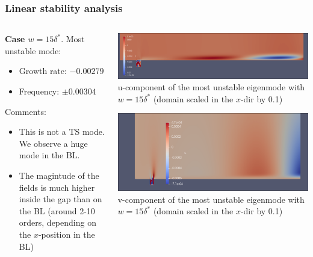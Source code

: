 \documentclass[
  aspectratio=169, %
  t, %
  onlytextwidth, %
  10pt, %
]{beamer}
\begin{document}
\begin{frame}
  \frametitle{Linear stability analysis}
  \begin{columns}[T] %
    \begin{column}{0.48\linewidth} %
      \textbf{Case $w = 15\delta^*$}. Most unstable mode:
      \begin{itemize}
	\item Growth rate: $-0.00279$
	\item Frequency: $\pm0.00304$
      \end{itemize}
      Comments:
      \begin{itemize}
	\item This is not a TS mode. We observe a huge mode in the BL.
	\item The magintude of the fields is much higher inside the gap than on the BL (around 2-10 orders, depending on the $x$-position in the BL)

      \end{itemize}
    \end{column}
    \begin{column}{0.48\linewidth} %
      {
	\centering
	\includegraphics[width=\linewidth]{Images/uem15.png}
	u-component of the most unstable eigenmode with $w = 15\delta^*$ (domain scaled in the $x$-dir by 0.1)

      }
      {
	\centering
	\includegraphics[width=\linewidth]{Images/vem15.png}
	v-component of the most unstable eigenmode with $w = 15\delta^*$ (domain scaled in the $x$-dir by 0.1)

      }
    \end{column}
  \end{columns}
\end{frame}
\end{document}
